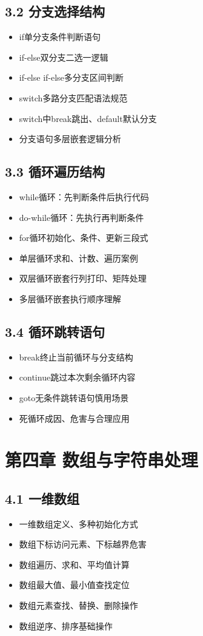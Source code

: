 \subsection*{3.2 分支选择结构}
\begin{itemize}
\item if单分支条件判断语句
\item if-else双分支二选一逻辑
\item if-else if-else多分支区间判断
\item switch多路分支匹配语法规范
\item switch中break跳出、default默认分支
\item 分支语句多层嵌套逻辑分析
\end{itemize}

\subsection*{3.3 循环遍历结构}
\begin{itemize}
\item while循环：先判断条件后执行代码
\item do-while循环：先执行再判断条件
\item for循环初始化、条件、更新三段式
\item 单层循环求和、计数、遍历案例
\item 双层循环嵌套行列打印、矩阵处理
\item 多层循环嵌套执行顺序理解
\end{itemize}

\subsection*{3.4 循环跳转语句}
\begin{itemize}
\item break终止当前循环与分支结构
\item continue跳过本次剩余循环内容
\item goto无条件跳转语句慎用场景
\item 死循环成因、危害与合理应用
\end{itemize}

\section*{第四章 数组与字符串处理}
\subsection*{4.1 一维数组}
\begin{itemize}
\item 一维数组定义、多种初始化方式
\item 数组下标访问元素、下标越界危害
\item 数组遍历、求和、平均值计算
\item 数组最大值、最小值查找定位
\item 数组元素查找、替换、删除操作
\item 数组逆序、排序基础操作
\end{itemize}

